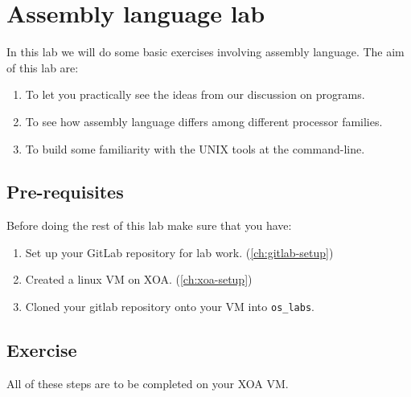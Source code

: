\chapter{Assembly language lab}
\label{ch:assembly-language-lab}

In this lab we will do some basic exercises involving assembly language.
The aim of this lab are:
\begin{enumerate}
\item To let you practically see the ideas from our discussion on programs.
\item To see how assembly language differs among different processor families.
\item To build some familiarity with the UNIX tools at the command-line.
\end{enumerate}

\section{Pre-requisites}

Before doing the rest of this lab make sure that you have:
\begin{enumerate}
\item Set up your GitLab repository for lab work. (\autoref{ch:gitlab-setup})
\item Created a linux VM on XOA. (\autoref{ch:xoa-setup})
\item Cloned your gitlab repository onto your VM into \texttt{os\_labs}.
\end{enumerate}

\section{Exercise}

All of these steps are to be completed on your XOA VM.

